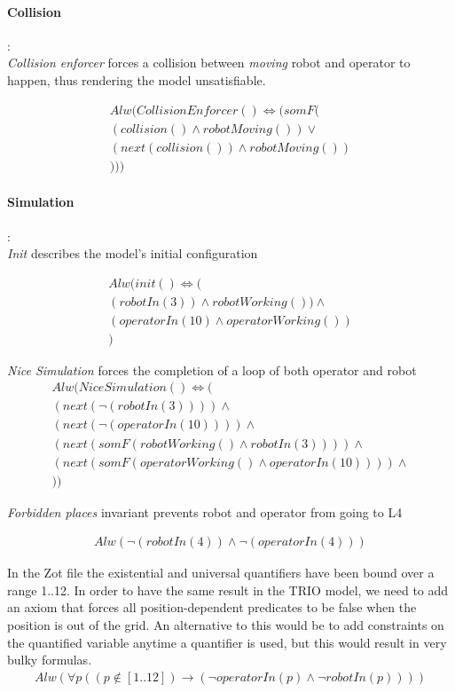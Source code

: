 \paragraph{Collision}:\\

\textit{Collision enforcer} forces a collision between \textit{moving} robot and operator to happen, thus rendering the model unsatisfiable.

\begin{align*}
	Alw(CollisionEnforcer()\iff (somF(\\
	(collision() \land robotMoving())\lor\\
	(next(collision()) \land robotMoving())\\
	)))
\end{align*}


\paragraph{Simulation}:\\

\textit{Init} describes the model's initial configuration

\begin{align*}
	Alw(init()\iff (\\
	(robotIn(3))\land robotWorking())\land \\
	(operatorIn(10)\land operatorWorking()) \\
	)
\end{align*}


\textit{Nice Simulation} forces the completion of a loop of both operator and robot
\begin{align*}
	Alw(NiceSimulation()\iff (\\
	(next(\neg(robotIn(3)))) \land \\
	(next(\neg(operatorIn(10)))) \land \\
	(next(somF(robotWorking()\land robotIn(3)))) \land \\
	(next(somF(operatorWorking()\land operatorIn(10)))) \land \\
	))
\end{align*}

\textit{Forbidden places} invariant prevents robot and operator from going to L4

\begin{align*}
	Alw(\neg(robotIn(4)) \land \neg(operatorIn(4)))
\end{align*}

In the Zot file the existential and universal quantifiers have been bound over a range 1..12. In order to have the same result in the TRIO model, we need to add an axiom that forces all position-dependent predicates to be false when the position is out of the grid. An alternative to this would be to add constraints on the quantified variable anytime a quantifier is used, but this would result in very bulky formulas.
\begin{align*}
	Alw(\forall p ((p\notin[1..12])\longrightarrow(\neg operatorIn(p)\land \neg robotIn(p))))
\end{align*}


